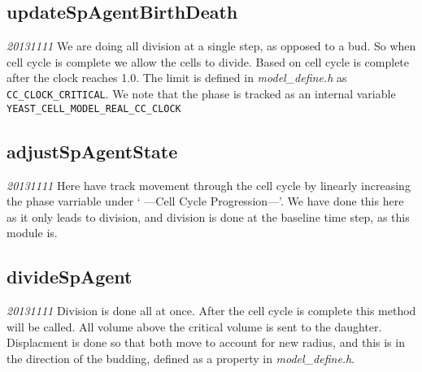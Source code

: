 \documentclass{article}
\begin{document}
\subsection{updateSpAgentBirthDeath }
\emph{20131111} We are doing all division at a single step,
as opposed to a bud.
So when cell cycle is complete we allow the cells to divide.
Based on \cite{Charvin2009} cell cycle is complete after the clock reaches 1.0.
The limit is defined in \emph{model\_define.h} as \texttt{CC\_CLOCK\_CRITICAL}.
We note that the phase is tracked as an internal variable \texttt{YEAST\_CELL\_MODEL\_REAL\_CC\_CLOCK}

\subsection{adjustSpAgentState}
\emph{20131111} Here have track movement through the cell cycle by linearly increasing the phase varriable under ` ---Cell Cycle Progression---'.
We have done this here as it only leads to division, and division is done at the baseline time step, as this module is.

\subsection{divideSpAgent}
\emph{20131111} Division is done all at once.  
After the cell cycle is complete this method will be called.
All volume above the critical volume is sent to the daughter.
Displacment is done so that both move to account for new radius, 
and this is in the direction of the budding, defined as a property in \emph{model\_define.h}.
 

 
\end{document}
